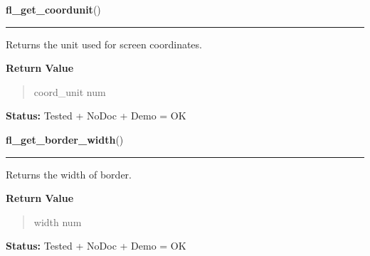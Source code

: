     \vspace{0.5ex}

\hspace{.8\funcindent}\begin{boxedminipage}{\funcwidth}

    \raggedright \textbf{fl\_get\_coordunit}()

    \vspace{-1.5ex}

    \rule{\textwidth}{0.5\fboxrule}
\setlength{\parskip}{2ex}
    Returns the unit used for screen coordinates.

\setlength{\parskip}{1ex}
      \textbf{Return Value}
    \vspace{-1ex}

      \begin{quote}
      coord\_unit num

      \end{quote}

\textbf{Status:} Tested + NoDoc + Demo = OK



    \end{boxedminipage}

    \label{xformslib:library:fl_get_border_width}

    \vspace{0.5ex}

\hspace{.8\funcindent}\begin{boxedminipage}{\funcwidth}

    \raggedright \textbf{fl\_get\_border\_width}()

    \vspace{-1.5ex}

    \rule{\textwidth}{0.5\fboxrule}
\setlength{\parskip}{2ex}
    Returns the width of border.

\setlength{\parskip}{1ex}
      \textbf{Return Value}
    \vspace{-1ex}

      \begin{quote}
      width num

      \end{quote}

\textbf{Status:} Tested + NoDoc + Demo = OK



    \end{boxedminipage}

